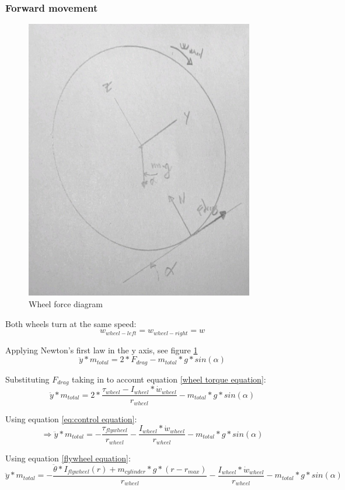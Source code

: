 \subsubsection{Forward movement}
\begin{figure}
	\centering
	\includegraphics[width=10cm]{img/wheel_diagram_drag.jpg}
	\caption{Wheel force diagram}
	\label{fig:Wheel forward force diagram}
\end{figure}
Both wheels turn at the same speed:
\[ w_{wheel-left} = w_{wheel-right} = w \]

Applying Newton's first law in the y axis, see figure \ref{fig:Wheel forward force diagram}
\[\ddot{y}*m_{total} = 2 * F_{drag} - m_{total} * g * sin(\alpha)\]

Substituting $F_{drag}$ taking in to account equation \ref{wheel torque equation}:
\[\ddot{y}*m_{total} = 2 * \frac{\tau_{wheel} - I_{wheel} * \dot{w}_{wheel}}{r_{wheel}} - m_{total} * g * sin(\alpha)\]

Using equation \ref{eq:control equation}:
\[\Rightarrow  \ddot{y}*m_{total} = - \frac{\tau_{flywheel}}{r_{wheel}} - \frac{I_{wheel} * \dot{w}_{wheel}}{r_{wheel}} - m_{total} * g * sin(\alpha)\]

Using equation \ref{flywheel equation}:
\begin{equation}\label{rectilinium equation}
    \ddot{y}*m_{total} = - \frac{\ddot{\theta}*I_{flywheel}(r) + m_{cylinder} * g * (r - r_{max})}{r_{wheel}} - \frac{I_{wheel} * \dot{w}_{wheel}}{r_{wheel}} - m_{total} * g * sin(\alpha)  
\end{equation}

